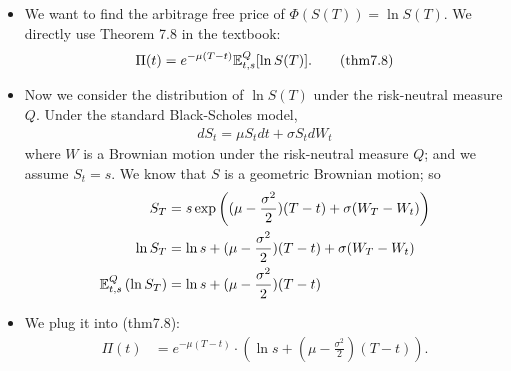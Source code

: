 \begin{example}[Pricing $\ln S_T$]
	\begin{itemize}
		\item We want to find the arbitrage free price of $\Phi(S(T)) = \ln S(T)$. We directly use Theorem 7.8 in the textbook:
		\begin{align*}
		\Pi(t) = e^{-\mu(T-t)} \mathbb{E}_{t,s}^Q [ \ln S(T) ]. \tag{thm7.8}
		\end{align*} 
		
		\item Now we consider the distribution of $\ln S(T)$ under the risk-neutral measure $Q$. Under the standard Black-Scholes model, 
		\begin{align*}
		d S_t = \mu S_t d t + \sigma S_t d W_t \tag{7.43-7.44}
		\end{align*}
		where $W$ is a Brownian motion under the risk-neutral measure $Q$; and we assume $S_t =s$. We know that $S$ is a geometric Brownian motion; so
		\begin{align*}
		S_T &= s \exp\left(  (\mu - \frac{\sigma^2}{2})(T-t) + \sigma(W_T-W_t)   \right) \\
		\ln S_T &= \ln s + (\mu - \frac{\sigma^2}{2})(T-t) + \sigma(W_T-W_t) \\
		\mathbb{E}^Q_{t,s}\left(\ln S_T\right) &=  \ln s + (\mu - \frac{\sigma^2}{2})(T-t)
		\end{align*} 
		
		\item We plug it into (thm7.8):
		\begin{align*}
		\Pi(t) &= e^{-\mu(T-t)} \cdot \left(\ln s + (\mu - \frac{\sigma^2}{2})(T-t)\right).
		\end{align*} 
		
	\end{itemize}
\end{example}

